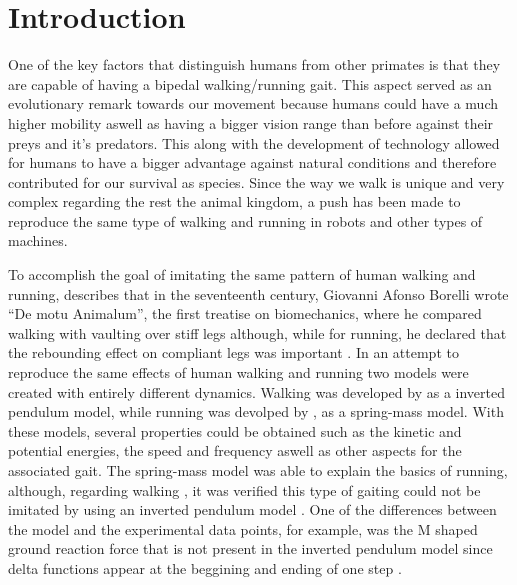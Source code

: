 

\section{Introduction}
One of the key factors that distinguish humans from other primates is that they are capable of having a bipedal walking/running gait. This aspect served as an evolutionary remark towards our movement because humans could have a much higher mobility aswell as having a bigger vision range than before against their preys and it's predators. This along with the development of technology allowed for humans to have a bigger advantage against natural conditions and therefore contributed for our survival as species. Since the way we walk is unique and very complex \cite{Mochon&McMahon} regarding the rest the animal kingdom, a push has been made to reproduce the same type of walking and running in robots and other types of machines.


To accomplish the goal of imitating the same pattern of human walking and running, \cite{Seyfarth2006} describes that in the seventeenth century, Giovanni Afonso Borelli wrote ``De motu Animalum'', the first treatise on biomechanics, where he compared walking with vaulting over stiff legs although, while for running, he declared that the rebounding effect on compliant legs was important \cite{Borelli1685}. In an attempt to reproduce the same effects of human walking and running two models were created with entirely different dynamics. Walking was developed by \cite{Alexander1976,Mochon&McMahon,Cavagna1976} as a inverted pendulum model, while running was devolped by \cite{Blickhan1989,McMahon&Cheng1990}, as a spring-mass model. With these models, several properties could be obtained such as the kinetic and potential energies, the speed and frequency aswell as other aspects for the associated gait. The spring-mass model was able to explain the basics of running, although, regarding walking , it was verified this type of gaiting could not be imitated by using an inverted pendulum model \cite{Full&Koditchek1999}. One of the differences between the model and the experimental data points, for example, was the M shaped ground reaction force that is not present in the inverted pendulum model since  delta functions appear at the beggining and ending of one step \cite{Pandy2003}.

